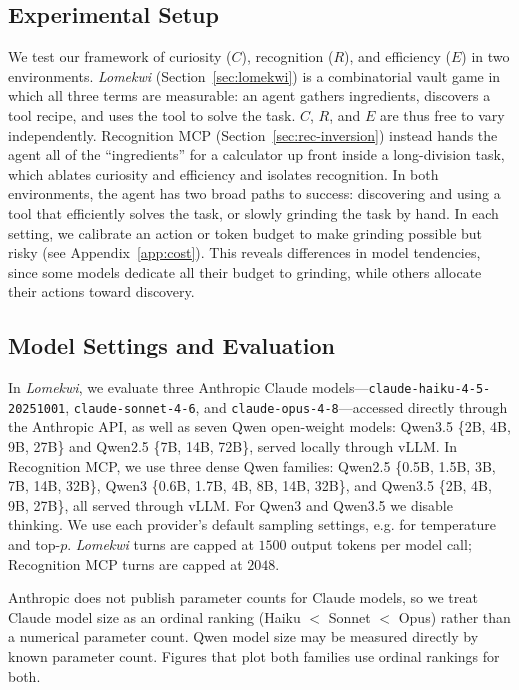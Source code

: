 \documentclass{article}
\begin{document}
\subsection{Experimental Setup}
\label{subsec:exp-setup}

We test our framework of curiosity ($C$), recognition ($R$), and efficiency ($E$) in two environments. \emph{Lomekwi} (Section~\ref{sec:lomekwi}) is a combinatorial vault game in which all three terms are measurable: an agent gathers ingredients, discovers a tool recipe, and uses the tool to solve the task. $C$, $R$, and $E$ are thus free to vary independently. Recognition MCP (Section~\ref{sec:rec-inversion}) instead hands the agent all of the ``ingredients'' for a calculator up front inside a long-division task, which ablates curiosity and efficiency and isolates recognition. In both environments, the agent has two broad paths to success: discovering and using a tool that efficiently solves the task, or slowly grinding the task by hand. In each setting, we calibrate an action or token budget to make grinding possible but risky (see Appendix~\ref{app:cost}). This reveals differences in model tendencies, since some models dedicate all their budget to grinding, while others allocate their actions toward discovery.

\subsection{Model Settings and Evaluation}
\label{subsec:model-settings}

In \emph{Lomekwi}, we evaluate three Anthropic Claude models---\texttt{claude-haiku-4-5-20251001}, \texttt{claude-sonnet-4-6}, and \texttt{claude-opus-4-8}---accessed directly through the Anthropic API, as well as seven Qwen open-weight models: Qwen3.5 \{2B, 4B, 9B, 27B\} and Qwen2.5 \{7B, 14B, 72B\}, served locally through vLLM. In Recognition MCP, we use three dense Qwen families: Qwen2.5 \{0.5B, 1.5B, 3B, 7B, 14B, 32B\}, Qwen3 \{0.6B, 1.7B, 4B, 8B, 14B, 32B\}, and Qwen3.5 \{2B, 4B, 9B, 27B\}, all served through vLLM. For Qwen3 and Qwen3.5 we disable thinking. We use each provider's default sampling settings, e.g. for temperature and top-$p$. \emph{Lomekwi} turns are capped at $1500$ output tokens per model call; Recognition MCP turns are capped at $2048$.

Anthropic does not publish parameter counts for Claude models, so we treat Claude model size as an ordinal ranking (Haiku $<$ Sonnet $<$ Opus) rather than a numerical parameter count. Qwen model size may be measured directly by known parameter count. Figures that plot both families use ordinal rankings for both.
\end{document}
